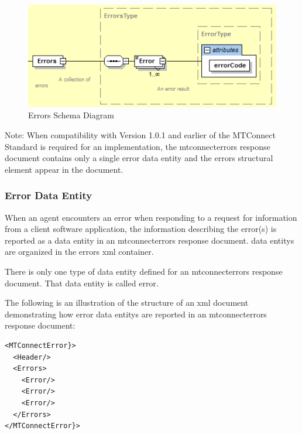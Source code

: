 \begin{figure}[ht]
  \centering
  \includegraphics[width=1.0\textwidth]{figures/errors-schema-diagram.png}
  \caption{Errors Schema Diagram}
  \label{fig:errors-schema-diagram}
\end{figure}

\FloatBarrier



\begin{note}
Note:	When compatibility with Version 1.0.1 and earlier of the MTConnect Standard is required for an implementation, the \gls{mtconnecterrors response document} contains only a single \gls{error} \gls{data entity} and the \gls{errors} \gls{structural element} \MUSTNOT appear in the document. 

\end{note}

\clearpage

\subsubsection{Error Data Entity}

When an \gls{agent} encounters an error when responding to a \gls{request} for information from a client software application, the information describing the error(s) is reported as a \gls{data entity} in an \gls{mtconnecterrors response document}.   \glspl{data entity} are organized in the \gls{errors} \gls{xml} container.

There is only one type of \gls{data entity} defined for an \gls{mtconnecterrors response document}.  That \gls{data entity} is called \gls{error}.

The following is an illustration of the structure of an \gls{xml} document demonstrating how \gls{error} \glspl{data entity} are reported in an \gls{mtconnecterrors response document}:

\begin{lstlisting}[firstnumber=1,escapechar=|,%
caption={Example of Error in MTConnectError}, label={lst:error-in mtconnecterror}]
<MTConnectError}>
  <Header/>
  <Errors>
    <Error/>
    <Error/>
    <Error/>
  </Errors>
</MTConnectError}>    
\end{lstlisting}

